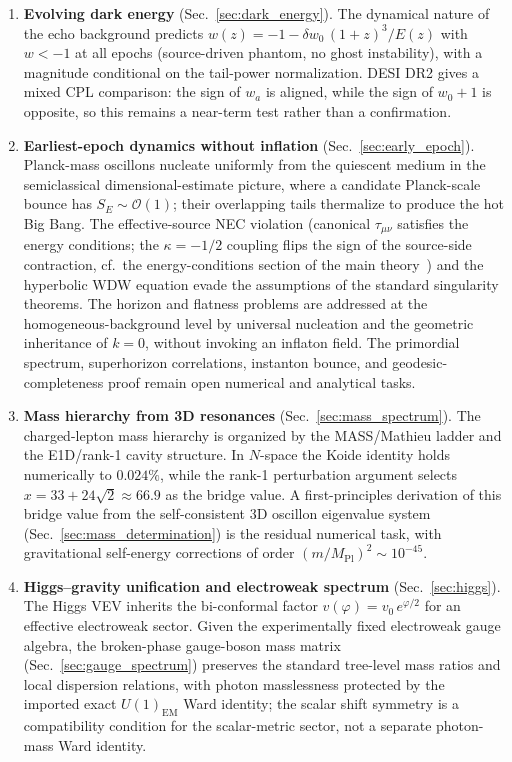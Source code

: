 \documentclass[aps,prd,onecolumn,superscriptaddress,nofootinbib,showpacs,12pt,notitlepage]{revtex4-2}
\newcommand{\Mpl}{M_{\mathrm{Pl}}}
\renewcommand{\order}[1]{\mathcal{O}\!\left(#1\right)}
\begin{document}
\begin{enumerate}
  \item \textbf{Evolving dark energy}
    (Sec.~\ref{sec:dark_energy}).  The dynamical
    nature of the echo background predicts
    $w(z) = -1 - \delta w_0\,(1+z)^3/E(z)$ with $w < -1$ at all
    epochs (source-driven phantom, no ghost instability),
    with a magnitude conditional on the tail-power
    normalization.  DESI DR2 gives a mixed CPL comparison:
    the sign of $w_a$ is aligned, while the sign of
    $w_0+1$ is opposite, so this remains a near-term test
    rather than a confirmation.

  \item \textbf{Earliest-epoch dynamics without inflation}
    (Sec.~\ref{sec:early_epoch}).  Planck-mass oscillons
    nucleate uniformly from the quiescent medium in the
    semiclassical dimensional-estimate picture, where a
    candidate Planck-scale bounce has
    $S_E \sim \order{1}$;
    their overlapping tails thermalize to produce the
    hot Big Bang.  The effective-source NEC violation
    (canonical $\tau_{\mu\nu}$ satisfies the energy
    conditions; the $\kappa=-1/2$ coupling flips the sign
    of the source-side contraction, cf.\ the
    energy-conditions section of the main
    theory~\cite{Lotishvili2026}) and the hyperbolic WDW
    equation evade the assumptions of the standard
    singularity theorems.  The horizon and flatness
    problems are addressed at the homogeneous-background
    level by universal nucleation and the geometric
    inheritance of $k = 0$, without invoking an inflaton
    field.  The primordial spectrum, superhorizon
    correlations, instanton bounce, and geodesic-
    completeness proof remain open numerical and
    analytical tasks.

  \item \textbf{Mass hierarchy from 3D resonances}
    (Sec.~\ref{sec:mass_spectrum}).  The charged-lepton
    mass hierarchy is organized by the MASS/Mathieu ladder
    and the E1D/rank-1 cavity structure.  In $N$-space the
    Koide identity holds numerically to $0.024\%$, while the
    rank-1 perturbation argument selects
    $x = 33+24\sqrt{2} \approx 66.9$ as the bridge value.
    A first-principles derivation of this bridge value from
    the self-consistent $3$D oscillon eigenvalue system
    (Sec.~\ref{sec:mass_determination}) is the residual
    numerical task, with gravitational self-energy corrections
    of order $(m/\Mpl)^2 \sim 10^{-45}$.

  \item \textbf{Higgs--gravity unification and electroweak
    spectrum} (Sec.~\ref{sec:higgs}).  The Higgs VEV inherits
    the bi-conformal factor
    $v(\varphi) = v_0\,e^{\varphi/2}$ for an effective
    electroweak sector.  Given the experimentally fixed
    electroweak gauge algebra, the
    broken-phase gauge-boson mass matrix
    (Sec.~\ref{sec:gauge_spectrum}) preserves the standard
    tree-level mass ratios and local dispersion relations,
    with photon masslessness protected by the imported exact
    $U(1)_{\mathrm{EM}}$ Ward identity; the scalar shift
    symmetry is a compatibility condition for the
    scalar-metric sector, not a separate photon-mass Ward
    identity.


\end{enumerate}
\end{document}
